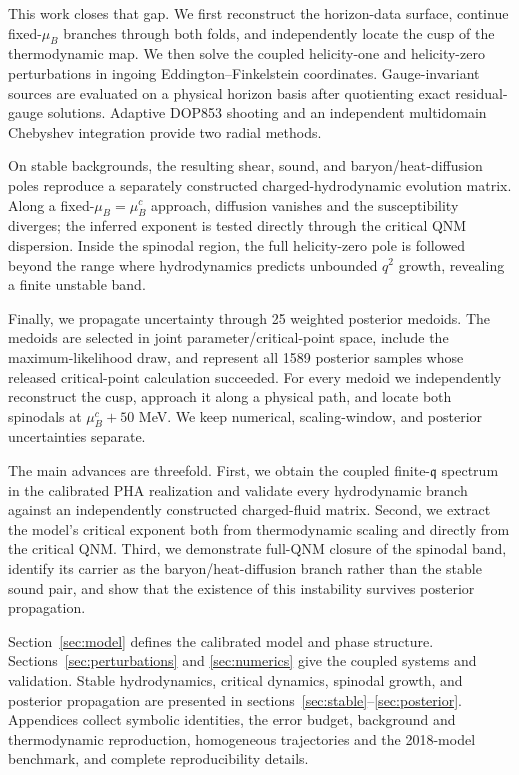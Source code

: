 \documentclass[11pt,a4paper]{article}
\newcommand{\mub}{\mu_B}
\newcommand{\q}{\mathfrak{q}}
\begin{document}
This work closes that gap.  We first reconstruct the horizon-data surface,
continue fixed-$\mub$ branches through both folds, and independently locate
the cusp of the thermodynamic map.  We then solve the coupled helicity-one and
helicity-zero perturbations in ingoing Eddington--Finkelstein coordinates.
Gauge-invariant sources are evaluated on a physical horizon basis after
quotienting exact residual-gauge solutions.  Adaptive DOP853 shooting and an
independent multidomain Chebyshev integration provide two radial methods.

On stable backgrounds, the resulting shear, sound, and baryon/heat-diffusion
poles reproduce a separately constructed charged-hydrodynamic evolution
matrix.  Along a fixed-$\mub=\mub^c$ approach, diffusion vanishes and the
susceptibility diverges; the inferred exponent is tested directly through
the critical QNM dispersion.  Inside the spinodal region, the full
helicity-zero pole is followed beyond the range where hydrodynamics predicts
unbounded $q^2$ growth, revealing a finite unstable band.

Finally, we propagate uncertainty through 25 weighted posterior medoids.  The
medoids are selected in joint parameter/critical-point space, include the
maximum-likelihood draw, and represent all 1589 posterior samples whose
released critical-point calculation succeeded.  For every medoid we
independently reconstruct the cusp, approach it along a physical path, and
locate both spinodals at $\mub^c+50$ MeV.  We keep numerical, scaling-window,
and posterior uncertainties separate.

The main advances are threefold.  First, we obtain the coupled finite-$\q$
spectrum in the calibrated PHA realization and validate every hydrodynamic
branch against an independently constructed charged-fluid matrix.  Second,
we extract the model's critical exponent both from thermodynamic scaling and
directly from the critical QNM.  Third, we demonstrate full-QNM closure of the
spinodal band, identify its carrier as the baryon/heat-diffusion branch rather
than the stable sound pair, and show that the existence of this instability
survives posterior propagation.

Section~\ref{sec:model} defines the calibrated model and phase structure.
Sections~\ref{sec:perturbations} and \ref{sec:numerics} give the coupled
systems and validation.  Stable hydrodynamics, critical dynamics, spinodal
growth, and posterior propagation are presented in
sections~\ref{sec:stable}--\ref{sec:posterior}.  Appendices collect symbolic
identities, the error budget, background and thermodynamic reproduction,
homogeneous trajectories and the 2018-model benchmark, and complete
reproducibility details.
\end{document}
